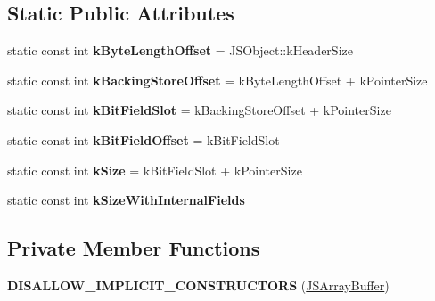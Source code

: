 \subsection*{Static Public Attributes}
\begin{DoxyCompactItemize}
\item 
static const int {\bfseries k\+Byte\+Length\+Offset} = J\+S\+Object\+::k\+Header\+Size\hypertarget{classv8_1_1internal_1_1_j_s_array_buffer_a42dfdf6903db949329ac32a9e814b506}{}\label{classv8_1_1internal_1_1_j_s_array_buffer_a42dfdf6903db949329ac32a9e814b506}

\item 
static const int {\bfseries k\+Backing\+Store\+Offset} = k\+Byte\+Length\+Offset + k\+Pointer\+Size\hypertarget{classv8_1_1internal_1_1_j_s_array_buffer_ae9a6c12ce71042c8b7a96e0907589777}{}\label{classv8_1_1internal_1_1_j_s_array_buffer_ae9a6c12ce71042c8b7a96e0907589777}

\item 
static const int {\bfseries k\+Bit\+Field\+Slot} = k\+Backing\+Store\+Offset + k\+Pointer\+Size\hypertarget{classv8_1_1internal_1_1_j_s_array_buffer_a490926fcd2686c5d12532ffb88d6deab}{}\label{classv8_1_1internal_1_1_j_s_array_buffer_a490926fcd2686c5d12532ffb88d6deab}

\item 
static const int {\bfseries k\+Bit\+Field\+Offset} = k\+Bit\+Field\+Slot\hypertarget{classv8_1_1internal_1_1_j_s_array_buffer_accb7690aacaadf4eea051bd08d6a7b71}{}\label{classv8_1_1internal_1_1_j_s_array_buffer_accb7690aacaadf4eea051bd08d6a7b71}

\item 
static const int {\bfseries k\+Size} = k\+Bit\+Field\+Slot + k\+Pointer\+Size\hypertarget{classv8_1_1internal_1_1_j_s_array_buffer_a2c244a25548a8a223c20bc0ac4fbd827}{}\label{classv8_1_1internal_1_1_j_s_array_buffer_a2c244a25548a8a223c20bc0ac4fbd827}

\item 
static const int {\bfseries k\+Size\+With\+Internal\+Fields}
\end{DoxyCompactItemize}
\subsection*{Private Member Functions}
\begin{DoxyCompactItemize}
\item 
{\bfseries D\+I\+S\+A\+L\+L\+O\+W\+\_\+\+I\+M\+P\+L\+I\+C\+I\+T\+\_\+\+C\+O\+N\+S\+T\+R\+U\+C\+T\+O\+RS} (\hyperlink{classv8_1_1internal_1_1_j_s_array_buffer}{J\+S\+Array\+Buffer})\hypertarget{classv8_1_1internal_1_1_j_s_array_buffer_a2333dcfeaabbee01bea8ba2a83f365d0}{}\label{classv8_1_1internal_1_1_j_s_array_buffer_a2333dcfeaabbee01bea8ba2a83f365d0}

\end{DoxyCompactItemize}

